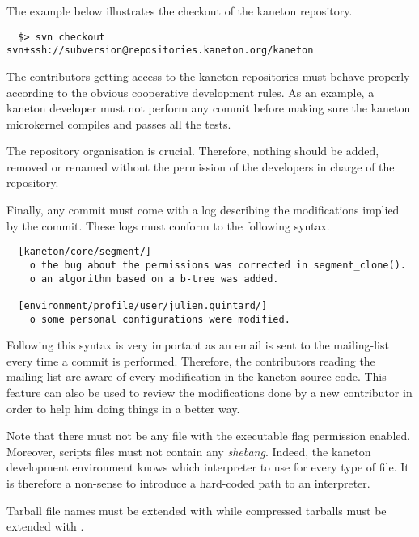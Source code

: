 The example below illustrates the checkout of the kaneton repository.

\begin{verbatim}
  $> svn checkout svn+ssh://subversion@repositories.kaneton.org/kaneton
\end{verbatim}

The contributors getting access to the kaneton repositories must behave
properly according to the obvious cooperative development rules. As an
example, a kaneton developer must not perform any commit before making sure
the kaneton microkernel compiles and passes all the tests.

The repository organisation is crucial. Therefore, nothing should be
added, removed or renamed without the permission of the developers in charge
of the repository.

Finally, any commit must come with a log describing the modifications
implied by the commit. These logs must conform to the following syntax.

\begin{verbatim}
  [kaneton/core/segment/]
    o the bug about the permissions was corrected in segment_clone().
    o an algorithm based on a b-tree was added.

  [environment/profile/user/julien.quintard/]
    o some personal configurations were modified.
\end{verbatim}

Following this syntax is very important as an email is sent to the
 mailing-list every time a commit is performed.
Therefore, the contributors reading the mailing-list are aware of every
modification in the kaneton source code. This feature can also be used
to review the modifications done by a new contributor in order to help
him doing things in a better way.

Note that there must not be any file with the executable flag permission
enabled. Moreover, scripts files must not contain any \textit{shebang}.
Indeed, the kaneton development environment knows which interpreter to
use for every type of file. It is therefore a non-sense to introduce a
hard-coded path to an interpreter.

Tarball file names must be extended with  while 
compressed tarballs must be extended with .
